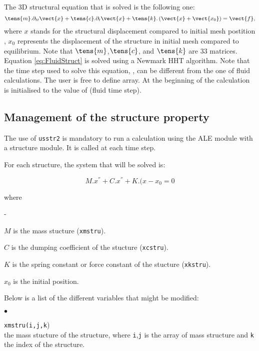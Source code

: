 {The 3D structural equation that is solved is the following one:
\begin{equation}\label{eq:FluidStruct}
\displaystyle
\tens{m}.\partial_{tt}\vect{x}+\tens{c}.\partial_{t}\vect{x}+\tens{k}.\left(\vect{x}+\vect{x_0}\right)=\vect{f},
\end{equation}
where $x$ stands for the structural displacement compared to initial mesh postition
 , $x_0$ represents
 the displacement of the structure in initial mesh compared to equilibrium.
Note that $\tens{m}$,$\tens{c}$, and $\tens{k}$ are 33 matrices.
Equation \eqref{eq:FluidStruct} is solved using a Newmark HHT algorithm.
Note that the time step used to solve this equation, , can be
 different from the one of fluid calculations. The user is free to define 
 array. At the beginning of the calculation  is initialised to the value of
  (fluid time step).

\subsection{Management of the structure property}

The use of \texttt{usstr2} is mandatory to run a calculation using the ALE 
 module with a structure module. It is called at each time step.

For each structure, the system that will be solved is:

\begin{equation}
M.x^{''}+C.x^{''}+K.(x-x_{0} = 0
\end{equation}

where

\begin{list}{-}{}
 \item $M$ is the mass stucture (\texttt{xmstru}).
 \item $C$ is the dumping coefficient of the stucture (\texttt{xcstru}).
 \item $K$ is the spring constant or force constant of the stucture (\texttt{xkstru}).
 \item $x_{0}$ is the initial position.
\end{list}

Below is a list of the different variables that might be modified:

\begin{list}{$\bullet$}{}

\item{\texttt{xmstru(i,j,k})} \\
{the mass stucture of the structure, where \texttt{i},\texttt{j} is
the array of mass structure and \texttt{k} the index of the structure.}


\end{list}}
